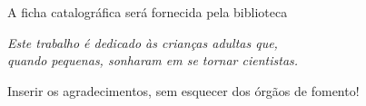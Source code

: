 \documentclass[
	oldfontcommands,
	sumario=tradicional,
	12pt,			%
	openright,		%
	oneside,		%
	a4paper,		%
	english,		%
	english			%
	]{imecc-unicamp}
\begin{document}
\begin{fichacatalografica}
    \begin{center}
	{\ABNTEXchapterfont\large A ficha catalográfica será fornecida pela biblioteca}
    \end{center}
%     
\end{fichacatalografica}
\begin{folhadeaprovacao}
%     
\end{folhadeaprovacao}
\begin{dedicatoria}
   \vspace*{\fill}
   \centering
   \noindent
   \textit{
      Este trabalho é dedicado às crianças adultas que,\\
      quando pequenas, sonharam em se tornar cientistas.
   }
   \vspace*{\fill}
\end{dedicatoria}
\begin{agradecimentos}
Inserir os agradecimentos, sem esquecer dos órgãos de fomento!
\end{agradecimentos}
\end{document}
